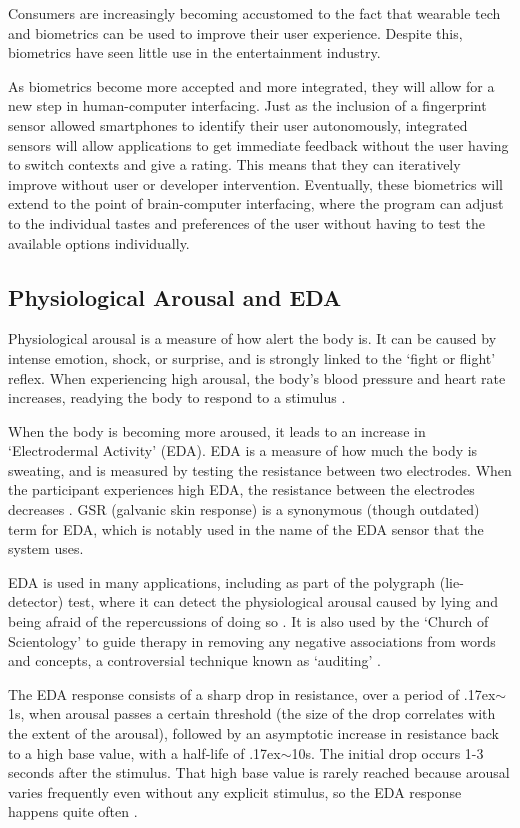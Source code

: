 \documentclass[12pt,a4paper]{article}
\begin{document}
Consumers are increasingly becoming accustomed to the fact that wearable tech and biometrics can be used to improve their user experience. Despite this, biometrics have seen little use in the entertainment industry.

As biometrics become more accepted and more integrated, they will allow for a new step in human-computer interfacing. Just as the inclusion of a fingerprint sensor allowed smartphones to identify their user autonomously, integrated sensors will allow applications to get immediate feedback without the user having to switch contexts and give a rating. This means that they can iteratively improve without user or developer intervention. Eventually, these biometrics will extend to the point of brain-computer interfacing, where the program can adjust to the individual tastes and preferences of the user without having to test the available options individually.

\subsection{Physiological Arousal and EDA}
Physiological arousal is a measure of how alert the body is. It can be caused by intense emotion, shock, or surprise, and is strongly linked to the `fight or flight' reflex. When experiencing high arousal, the body's blood pressure and heart rate increases, readying the body to respond to a stimulus \cite[pp.162-167]{arousal}.

When the body is becoming more aroused, it leads to an increase in `Electrodermal Activity' (EDA). EDA is a measure of how much the body is sweating, and is measured by testing the resistance between two electrodes. When the participant experiences high EDA, the resistance between the electrodes decreases \cite[pp.2-3]{eda}. GSR (galvanic skin response) is a synonymous (though outdated) term for EDA, which is notably used in the name of the EDA sensor that the system uses.

EDA is used in many applications, including as part of the polygraph (lie-detector) test, where it can detect the physiological arousal caused by lying and being afraid of the repercussions of doing so \cite{polygraph}. It is also used by the `Church of Scientology' to guide therapy in removing any negative associations from words and concepts, a controversial technique known as `auditing' \cite[p.32]{auditing}.

The EDA response consists of a sharp drop in resistance, over a period of {\raise.17ex\hbox{$\scriptstyle\sim$}}1s, when arousal passes a certain threshold (the size of the drop correlates with the extent of the arousal), followed by an asymptotic increase in resistance back to a high base value, with a half-life of {\raise.17ex\hbox{$\scriptstyle\sim$}}10s. The initial drop occurs 1-3 seconds after the stimulus. That high base value is rarely reached because arousal varies frequently even without any explicit stimulus, so the EDA response happens quite often \cite{edaAnalysis}.
\end{document}

